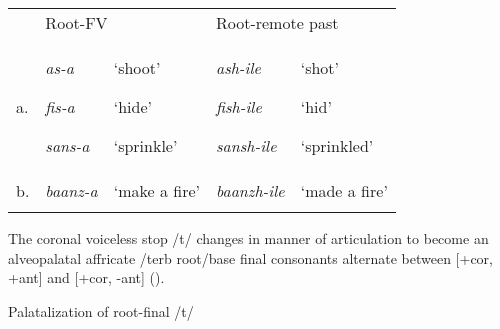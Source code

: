 \documentclass[output=paper]{langsci/langscibook}
\begin{document}
\begin{tabular}{lllll} & \multicolumn{2}{l}{\mdseries Root-FV} & \multicolumn{2}{l}{\mdseries Root-remote past}\\
\lsptoprule
\mdseries a. & {\mdseries \emph{as-a}}

{\mdseries \emph{fis-a}}

\mdseries \emph{sans-a} & {\mdseries ‘shoot’}

{\mdseries ‘hide’}

\mdseries ‘sprinkle’ & {\mdseries \emph{ash-ile}}

{\mdseries \emph{fish-ile}}

\mdseries \emph{sansh-ile} & {\mdseries ‘shot’}

{\mdseries ‘hid’}

\mdseries ‘sprinkled’\\
\mdseries b. & \mdseries \emph{baanz-a} & \mdseries ‘make a fire’ & \mdseries \emph{baanzh-ile} & \mdseries ‘made a fire’\\
\lspbottomrule
\end{tabular}
The coronal voiceless stop /t/ changes in manner of articulation to become an alveopalatal affricate /terb root/base final consonants alternate between [+cor, +ant] and [+cor, -ant] ().

\begin{table}
\caption{Palatalization of root-final /t/}
\label{tab:10}
\end{table}
\end{document}
